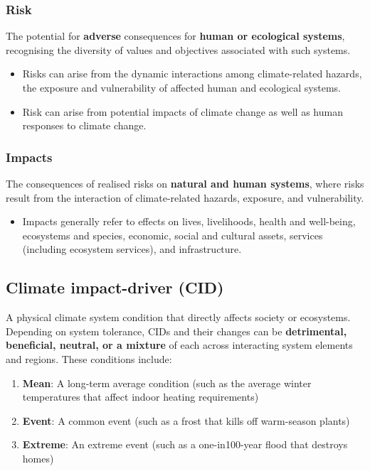 \documentclass[11pt]{article}
\begin{document}
\subsubsection{Risk}
\label{sec:org6bfcc16}
The potential for \textbf{adverse} consequences for \textbf{human or ecological systems}, recognising the diversity of values and objectives associated with such systems.
\begin{itemize}
\item Risks can arise from the dynamic interactions among climate-related hazards, the exposure and vulnerability of affected human and ecological systems.
\item Risk can arise from potential impacts of climate change as well as human responses to climate change.
\end{itemize}

\subsubsection{Impacts}
\label{sec:org3235520}
The consequences of realised risks on \textbf{natural and human systems}, where risks result from the interaction of climate-related hazards, exposure, and vulnerability.
\begin{itemize}
\item Impacts generally refer to effects on lives, livelihoods, health and well-being, ecosystems and species, economic, social and cultural assets, services (including ecosystem services), and infrastructure.
\end{itemize}

\subsection{Climate impact-driver (CID)}
\label{sec:org96d5b67}
A physical climate system condition that directly affects society or ecosystems. Depending on system tolerance, CIDs and their changes can be \textbf{detrimental, beneficial, neutral, or a mixture} of each across interacting system elements and regions. These conditions include:
\begin{enumerate}
\item \textbf{Mean}: A long-term average condition (such as the average winter temperatures that affect indoor heating requirements)
\item \textbf{Event}: A common event (such as a frost that kills off warm-season plants)
\item \textbf{Extreme}: An extreme event (such as a one-in100-year flood that destroys homes)
\end{enumerate}
\end{document}
